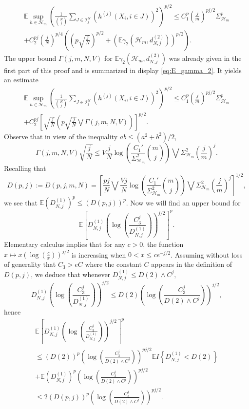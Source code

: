 \documentclass[12pt]{article}
\def\l{\left}
\def\r{\right}
\newcommand{\m}{\mathcal}
\newcommand{\mb}{\mathbb}
\theoremstyle{thmstyletwo}%
\theoremstyle{thmstylethree}%
\begin{document}
\begin{multline*}
\mb E \sup_{h \in \mathcal{H}_m} \l(\frac{1}{{N \choose j}} \sum_{J \in \mathcal{I}^N_j} \l(h^{(j)}\l(X_i, i \in J\r)\r)^2\r)^{p/2} \leq 
        C_1^{p}\l(\frac{j}{m}\r)^{pj/2} \Sigma_{\m H_m}^{p}
        \\
        + C_2^{pj} \l(\frac{j}{N}\r)^{p/4} \l( \l(p\sqrt{\frac{j}{N}}\r)^{p/2} + \l(\mb E \gamma_2 (\mathcal{H}_m, d^{(2)}_{N,j})\r)^{p/2}\r).  
\end{multline*}
The upper bound $\Gamma(j,m,N, V)$ for $\mb E \gamma_2 \l(\mathcal{H}_m, d^{(2)}_{N,j}\r)$ was already given in the first part of this proof and is summarized in display \eqref{eq:E_gamma_2}. It yields an estimate
\begin{multline*}
    \mb E \sup_{h \in \mathcal{H}_m} \l(\frac{1}{{N \choose j}} \sum_{J \in \mathcal{I}^N_j} \l(h^{(j)}\l(X_i, i \in J\r)\r)^2\r)^{p/2} \leq 
        C_1^{p}\l(\frac{j}{m}\r)^{pj/2} \Sigma_{\m H_m}^{p}
        \\
        + C_2^{pj} \l[\sqrt{\frac{j}{N}}\l( p\sqrt{\frac{j}{N}}\bigvee \Gamma(j,m,N, V)\r)\r]^{p/2}. 
\end{multline*}
Observe that in view of the inequality $ab\leq (a^2+b^2)/2$, 
\[
\Gamma(j,m,N,V)\sqrt{\frac{j}{N}}\leq  V\frac{j}{N}\log\l(\frac{C_1'}{\Sigma_{\m H_m}^2}{m \choose j}\r)\bigvee \Sigma^2_{\m H_m}\l(\frac{j}{m}\r)^{j}.
\]
Recalling that
\[
D(p,j):=D(p,j,m,N) = \l[\frac{pj}{N}\bigvee \frac{Vj}{N}\log\l(\frac{C_1'}{\Sigma_{\m H_m}^2}{m \choose j}\r)\bigvee \Sigma^2_{\m H_m}\l(\frac{j}{m}\r)^{j} \r]^{1/2},
\]
we see that $\mb E\l(D_{N,j}^{(1)}\r)^p \leq (D(p,j))^p$.
Now we will find an upper bound for 
\[
\mb E \l[D_{N,j}^{(1)} \l(\log\l(\frac{C_3^j}{D_{N,j}^{(1)}}\r)\r)^{j/2}\r]^p.
\]
Elementary calculus implies that for any $c > 0$, the function $x \mapsto x \l(\log\l(\frac{c}{x}\r)\r)^{j/2}$ is increasing when $0 < x \leq ce^{-j/2}$. Assuming without loss of generality that $C_3>eC$ where the constant $C$ appears in the definition of $D(p,j)$, we deduce that whenever $D_{N,j}^{(1)} \leq D(2)\wedge C^j$,
\begin{equation*}
     D_{N,j}^{(1)} \l(\log\l(\frac{C_3^j }{D_{N,j}^{(1)}}\r)\r)^{j/2}  \leq 
     D(2) \l(\log\l(\frac{C_3^j}{D(2)\wedge C^j}\r)\r)^{j/2},
\end{equation*}
hence
\begin{multline*}
    \mb E \l[D_{N,j}^{(1)} \l(\log\l(\frac{C_3^j }{D_{N,j}^{(1)}}\r)\r)^{j/2}\r]^p \\
    \leq (D(2))^p \l(\log\l(\frac{C_3^j}{D(2)\wedge C^j}\r)\r)^{pj/2}\mb E I\l\{D_{N,j}^{(1)} < D(2)\r\} \\
    + \mb E\l(D_{N,j}^{(1)} \r)^p \l(\log\l(\frac{C_3^j}{D(2)\wedge C^j}\r)\r)^{pj/2} \\
    \leq 2(D(p,j))^p \l(\log\l(\frac{C_3^j}{D(2)\wedge C^j}\r)\r)^{pj/2}.
\end{multline*}
\end{document}
